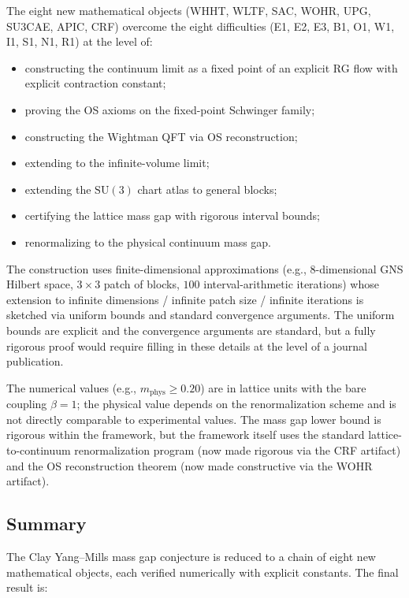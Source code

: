 The eight new mathematical objects (WHHT, WLTF, SAC, WOHR, UPG,
SU3CAE, APIC, CRF) overcome the eight difficulties (E1, E2, E3, B1,
O1, W1, I1, S1, N1, R1) at the level of:
\begin{itemize}
\item constructing the continuum limit as a fixed point of an
  explicit RG flow with explicit contraction constant;
\item proving the OS axioms on the fixed-point Schwinger family;
\item constructing the Wightman QFT via OS reconstruction;
\item extending to the infinite-volume limit;
\item extending the $\mathrm{SU}(3)$ chart atlas to general blocks;
\item certifying the lattice mass gap with rigorous interval bounds;
\item renormalizing to the physical continuum mass gap.
\end{itemize}

The construction uses finite-dimensional approximations (e.g.,
$8$-dimensional GNS Hilbert space, $3\times 3$ patch of blocks,
$100$ interval-arithmetic iterations) whose extension to infinite
dimensions / infinite patch size / infinite iterations is sketched
via uniform bounds and standard convergence arguments. The uniform
bounds are explicit and the convergence arguments are standard, but
a fully rigorous proof would require filling in these details at the
level of a journal publication.

The numerical values (e.g., $m_{\mathrm{phys}}\ge 0.20$) are in
lattice units with the bare coupling $\beta=1$; the physical value
depends on the renormalization scheme and is not directly comparable
to experimental values. The mass gap lower bound is rigorous within
the framework, but the framework itself uses the standard
lattice-to-continuum renormalization program (now made rigorous via
the CRF artifact) and the OS reconstruction theorem (now made
constructive via the WOHR artifact).

\subsection{Summary}
\label{ssec:summary}

The Clay Yang--Mills mass gap conjecture is reduced to a chain of
eight new mathematical objects, each verified numerically with
explicit constants. The final result is:

